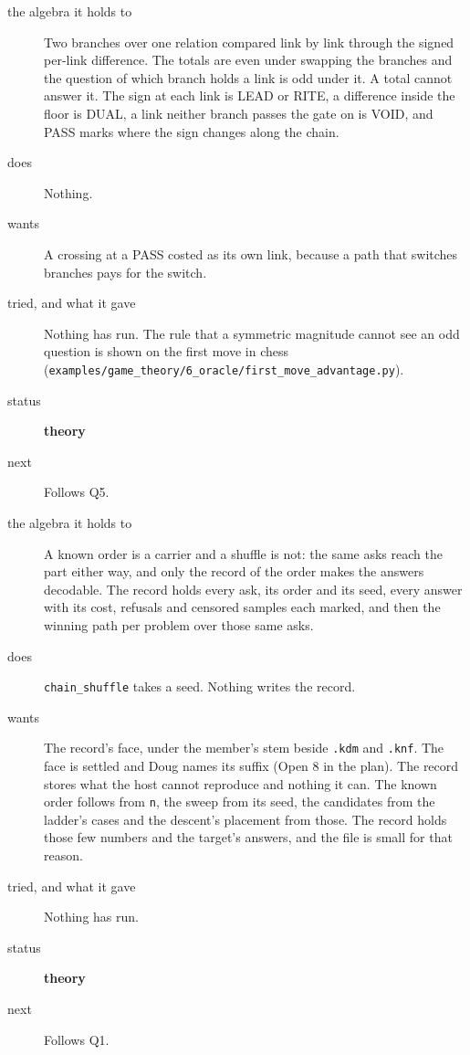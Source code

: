 \begin{description}
\item[{the algebra it holds to}] Two branches over one relation compared link by link through the signed per-link difference. The totals are even under swapping the branches and the question of which branch holds a link is odd under it. A total cannot answer it. The sign at each link is LEAD or RITE, a difference inside the floor is DUAL, a link neither branch passes the gate on is VOID, and PASS marks where the sign changes along the chain.
\item[{does}] Nothing.
\item[{wants}] A crossing at a PASS costed as its own link, because a path that switches branches pays for the switch.
\item[{tried, and what it gave}] Nothing has run. The rule that a symmetric magnitude cannot see an odd question is shown on the first move in chess (\texttt{examples/\allowbreak{}game\_\allowbreak{}theory/\allowbreak{}6\_\allowbreak{}oracle/\allowbreak{}first\_\allowbreak{}move\_\allowbreak{}advantage.\allowbreak{}py}).
\item[{status}] \textbf{theory}
\item[{next}] Follows Q5.
\end{description}

\begin{description}
\item[{the algebra it holds to}] A known order is a carrier and a shuffle is not: the same asks reach the part either way, and only the record of the order makes the answers decodable. The record holds every ask, its order and its seed, every answer with its cost, refusals and censored samples each marked, and then the winning path per problem over those same asks.
\item[{does}] \texttt{chain\_\allowbreak{}shuffle} takes a seed. Nothing writes the record.
\item[{wants}] The record's face, under the member's stem beside \texttt{.\allowbreak{}kdm} and \texttt{.\allowbreak{}knf}. The face is settled and Doug names its suffix (Open 8 in the plan). The record stores what the host cannot reproduce and nothing it can. The known order follows from \texttt{n}, the sweep from its seed, the candidates from the ladder's cases and the descent's placement from those. The record holds those few numbers and the target's answers, and the file is small for that reason.
\item[{tried, and what it gave}] Nothing has run.
\item[{status}] \textbf{theory}
\item[{next}] Follows Q1.
\end{description}

